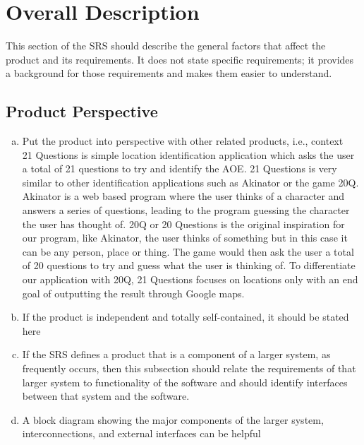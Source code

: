 \documentclass[titlepage]{article}
\begin{document}
		\section{Overall Description}
		\label{sec:overall_description}
		
		This section of the SRS should describe the general factors that affect the product and its requirements. It does not state specific requirements; it provides a background for those requirements and makes them easier to understand.
		
		\subsection{Product Perspective}
		\label{sub:product_perspective}
		\begin{enumerate}[a)]
			\item Put the product into perspective with other related products, i.e., context\\
			
			21 Questions is simple location identification application which asks the user a total of 21 questions to try and identify the AOE. 21 Questions is very similar to other identification applications such as Akinator or the game 20Q. Akinator is a web based program where the user thinks of a character and answers a series of questions, leading to the program guessing the character the user has thought of. 20Q or 20 Questions is the original inspiration for our program, like Akinator, the user thinks of something but in this case it can be any person, place or thing. The game would then ask the user a total of 20 questions to try and guess what the user is thinking of. To differentiate our application with 20Q, 21 Questions focuses on locations only with an end goal of outputting the result through Google maps.
			\item If the product is independent and totally self-contained, it should be stated here
			\item If the SRS defines a product that is a component of a larger system, as frequently occurs, then this subsection should relate the requirements of that larger system to functionality of the software and should identify interfaces between that system and the software. 
			\item A block diagram showing the major components of the larger system, interconnections, and external interfaces can be helpful
		\end{enumerate}
		
\end{document}

